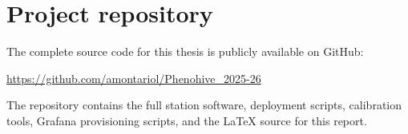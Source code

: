 ﻿\chapter{Project repository}
\label{ch:appendix-repository}

The complete source code for this thesis is publicly available on GitHub:

\begin{center}
  \url{https://github.com/amontariol/Phenohive_2025-26}
\end{center}

The repository contains the full station software, deployment scripts, calibration tools, Grafana provisioning scripts, and the \LaTeX{} source for this report.


